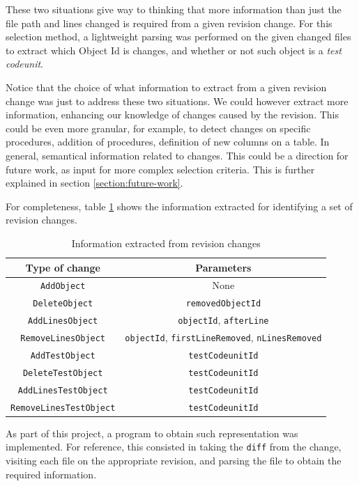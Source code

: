 \documentclass{article}
\begin{document}
These two situations give way to thinking that more information than just the file path and lines changed is required from a given revision change. For this selection method, a lightweight parsing was performed on the given changed files to extract which Object Id is changes, and whether or not such object is a \emph{test codeunit}.

Notice that the choice of what information to extract from a given revision change was just to address these two situations. We could however extract more information, enhancing our knowledge of changes caused by the revision. This could be even more granular, for example, to detect changes on specific procedures, addition of procedures, definition of new columns on a table. In general, semantical information related to changes. This could be a direction for future work, as input for more complex selection criteria. This is further explained in section \ref{section:future-work}.

For completeness, table \ref{table:revision-changes} shows the information extracted for identifying a set of revision changes. 

\begin{table}[H]
\centering
\begin{tabular}{||c c||} 
 \hline
 Type of change & Parameters \\
 \hline\hline
 \texttt{AddObject} & None\\
 \texttt{DeleteObject} & \texttt{removedObjectId} \\
 \texttt{AddLinesObject} & \texttt{objectId}, \texttt{afterLine} \\
 \texttt{RemoveLinesObject} & \texttt{objectId}, \texttt{firstLineRemoved}, \texttt{nLinesRemoved} \\
 \texttt{AddTestObject} & \texttt{testCodeunitId} \\
 \texttt{DeleteTestObject} & \texttt{testCodeunitId} \\
 \texttt{AddLinesTestObject} & \texttt{testCodeunitId} \\
 \texttt{RemoveLinesTestObject} & \texttt{testCodeunitId} \\
 \hline
\end{tabular}
\caption{Information extracted from revision changes}
\label{table:revision-changes}
\end{table}

As part of this project, a program to obtain such representation was implemented. For reference, this consisted in taking the \texttt{diff} from the change, visiting each file on the appropriate revision, and parsing the file to obtain the required information.
\end{document}
